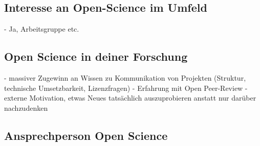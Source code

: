 \documentclass[11pt,a4paper]{article}
\begin{document}
\subsection{Interesse an Open-Science im Umfeld} %
- Ja, Arbeitsgruppe etc.

\subsection{Open Science in deiner Forschung}
- massiver Zugewinn an Wissen zu Kommunikation von Projekten (Struktur, technische Umsetzbarkeit, Lizenzfragen)
- Erfahrung mit Open Peer-Review
- externe Motivation, etwas Neues tatsächlich auszuprobieren anstatt nur darüber nachzudenken


\subsection{Ansprechperson Open Science}
\end{document}
